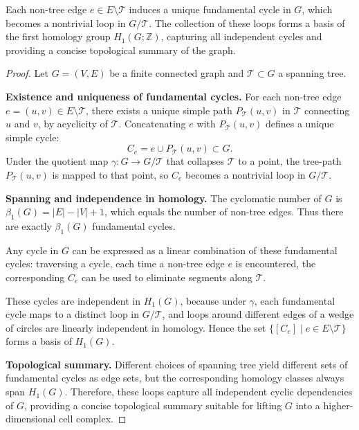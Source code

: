\begin{proposition}
\label{prop.fundamental_cycles}
Each non-tree edge $e \in E \setminus \mathcal{T}$ induces a unique fundamental cycle in $G$, which becomes a nontrivial loop in $G/\mathcal{T}$. 
The collection of these loops forms a basis of the first homology group $H_1(G;\mathbb{Z})$, capturing all independent cycles and providing a concise topological summary of the graph.
\end{proposition}
\begin{proof}
Let $G=(V,E)$ be a finite connected graph and $\mathcal{T} \subset G$ a spanning tree.

\textbf{Existence and uniqueness of fundamental cycles.}  
For each non-tree edge $e=(u,v) \in E \setminus \mathcal{T}$, there exists a unique simple path $P_{\mathcal{T}}(u,v)$ in $\mathcal{T}$ connecting $u$ and $v$, by acyclicity of $\mathcal{T}$.  
Concatenating $e$ with $P_{\mathcal{T}}(u,v)$ defines a unique simple cycle: 
\begin{equation}
C_e = e \cup P_{\mathcal{T}}(u,v) \subset G.
\end{equation}
Under the quotient map $\gamma: G \to G/\mathcal{T}$ that collapses $\mathcal{T}$ to a point, the tree-path $P_{\mathcal{T}}(u,v)$ is mapped to that point, so $C_e$ becomes a nontrivial loop in $G/\mathcal{T}$.

\textbf{Spanning and independence in homology.}  
The cyclomatic number of $G$ is $\beta_1(G) = |E| - |V| + 1$, which equals the number of non-tree edges.  
Thus there are exactly $\beta_1(G)$ fundamental cycles.  

Any cycle in $G$ can be expressed as a linear combination of these fundamental cycles: traversing a cycle, each time a non-tree edge $e$ is encountered, the corresponding $C_e$ can be used to eliminate segments along $\mathcal{T}$.  

These cycles are independent in $H_1(G)$, because under $\gamma$, each fundamental cycle maps to a distinct loop in $G/\mathcal{T}$, and loops around different edges of a wedge of circles are linearly independent in homology.  Hence the set 
$
\{ [C_e] \mid e \in E \setminus \mathcal{T} \}
$
forms a basis of $H_1(G)$.

\textbf{Topological summary.}  
Different choices of spanning tree yield different sets of fundamental cycles as edge sets, but the corresponding homology classes always span $H_1(G)$.  
Therefore, these loops capture all independent cyclic dependencies of $G$, providing a concise topological summary suitable for lifting $G$ into a higher-dimensional cell complex.
\end{proof}










